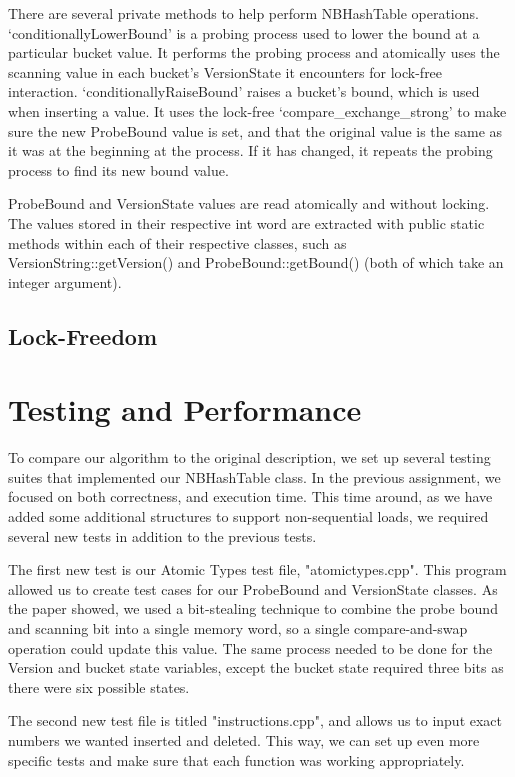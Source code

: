 \documentclass[journal]{IEEEtran}
\begin{document}
There are several private methods to help perform NBHashTable operations. ‘conditionallyLowerBound’ is a probing process used to lower the bound at a particular bucket value. It performs the probing process and atomically uses the scanning value in each bucket’s VersionState it encounters for lock-free interaction. ‘conditionallyRaiseBound’ raises a bucket’s bound, which is used when inserting a value. It uses the lock-free ‘compare\_exchange\_strong’ to make sure the new ProbeBound value is set, and that the original value is the same as it was at the beginning at the process. If it has changed, it repeats the probing process to find its new bound value.

ProbeBound and VersionState values are read atomically and without locking. The values stored in their respective int word are extracted with public static methods within each of their respective classes, such as VersionString::getVersion() and ProbeBound::getBound() (both of which take an integer argument).

\subsection{Lock-Freedom}


\section{Testing and Performance}

To compare our algorithm to the original description, we set up several testing suites that implemented our NBHashTable class. In the previous assignment, we focused on both correctness, and execution time. This time around, as we have added some additional structures to support non-sequential loads, we required several new tests in addition to the previous tests.

The first new test is our Atomic Types test file, "atomictypes.cpp". This program allowed us to create test cases for our ProbeBound and VersionState classes. As the paper showed, we used a bit-stealing technique to combine the probe bound and scanning bit into a single memory word, so a single compare-and-swap operation could update this value. The same process needed to be done for the Version and bucket state variables, except the bucket state required three bits as there were six possible states.

The second new test file is titled "instructions.cpp", and allows us to input exact numbers we wanted inserted and deleted. This way, we can set up even more specific tests and make sure that each function was working appropriately.
\end{document}

